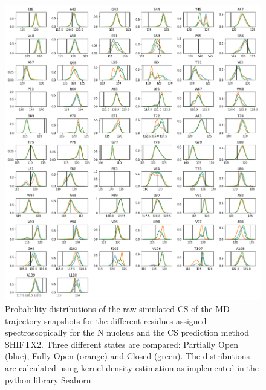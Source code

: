 \documentclass[%
 aip,
 amsmath,amssymb,
 preprint,%
]{revtex4-1}
\begin{document}
\begin{figure}[tbp]
	\includegraphics[width=\textwidth]{figures_SI/hist_sparta_plus_N.png}
	 \caption{\scriptsize
 Probability distributions of the raw simulated CS of the MD trajectory snapshots for the different residues assigned spectroscopically for the N nucleus and the CS prediction method SHIFTX2. Three different states are compared: Partially Open (blue), Fully Open (orange) and Closed (green). The distributions are calculated using kernel density estimation as implemented in the python library Seaborn. 
}
\label{SI_hist8}
\end{figure}
\end{document}
